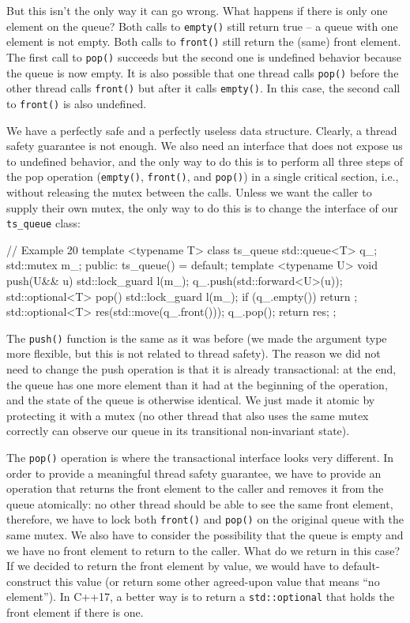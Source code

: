 But this isn't the only way it can go wrong. What happens if there is only one element on the queue? Both calls to \texttt{empty()} still return true -- a queue with one element is not empty. Both calls to \texttt{front()} still return the (same) front element. The first call to \texttt{pop()} succeeds but the second one is undefined behavior because the queue is now empty. It is also possible that one thread calls \texttt{pop()} before the other thread calls \texttt{front()} but after it calls \texttt{empty()}. In this case, the second call to \texttt{front()} is also undefined.

We have a perfectly safe and a perfectly useless data structure. Clearly, a thread safety guarantee is not enough. We also need an interface that does not expose us to undefined behavior, and the only way to do this is to perform all three steps of the pop operation (\texttt{empty()}, \texttt{front()}, and \texttt{pop()}) in a single critical section, i.e., without releasing the mutex between the calls. Unless we want the caller to supply their own mutex, the only way to do this is to change the interface of our \texttt{ts\_queue} class:

\begin{code}
// Example 20
template <typename T> class ts_queue {
  std::queue<T> q_;
  std::mutex m_;
  public:
  ts_queue() = default;
  template <typename U> void push(U&& u) {
    std::lock_guard l(m_);
    q_.push(std::forward<U>(u));
  }
  std::optional<T> pop() {
    std::lock_guard l(m_);
    if (q_.empty()) return {};
    std::optional<T> res(std::move(q_.front()));
    q_.pop();
    return res;
 }
};
\end{code}

The \texttt{push()} function is the same as it was before (we made the argument type more flexible, but this is not related to thread safety). The reason we did not need to change the push operation is that it is already transactional: at the end, the queue has one more element than it had at the beginning of the operation, and the state of the queue is otherwise identical. We just made it atomic by protecting it with a mutex (no other thread that also uses the same mutex correctly can observe our queue in its transitional non-invariant state).

The \texttt{pop()} operation is where the transactional interface looks very different. In order to provide a meaningful thread safety guarantee, we have to provide an operation that returns the front element to the caller and removes it from the queue atomically: no other thread should be able to see the same front element, therefore, we have to lock both \texttt{front()} and \texttt{pop()} on the original queue with the same mutex. We also have to consider the possibility that the queue is empty and we have no front element to return to the caller. What do we return in this case? If we decided to return the front element by value, we would have to default-construct this value (or return some other agreed-upon value that means ``no element''). In C++17, a better way is to return a \texttt{std::optional} that holds the front element if there is one.

